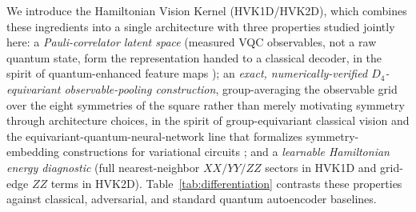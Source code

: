 \documentclass[journal]{IEEEtran}
\begin{document}
We introduce the Hamiltonian Vision Kernel (HVK1D/HVK2D), which combines these ingredients into a single architecture with three properties studied jointly here: a \emph{Pauli-correlator latent space} (measured VQC observables, not a raw quantum state, form the representation handed to a classical decoder, in the spirit of quantum-enhanced feature maps \cite{Havlicek2019}); an \emph{exact, numerically-verified $D_4$-equivariant observable-pooling construction}, group-averaging the observable grid over the eight symmetries of the square rather than merely motivating symmetry through architecture choices, in the spirit of group-equivariant classical vision \cite{Cohen2016, Bronstein2021} and the equivariant-quantum-neural-network line that formalizes symmetry-embedding constructions for variational circuits \cite{Meyer2023, Nguyen2024EQNN, Schatzki2024, West2024}; and a \emph{learnable Hamiltonian energy diagnostic} (full nearest-neighbor $XX/YY/ZZ$ sectors in HVK1D and grid-edge $ZZ$ terms in HVK2D). Table~\ref{tab:differentiation} contrasts these properties against classical, adversarial, and standard quantum autoencoder baselines.
\end{document}
